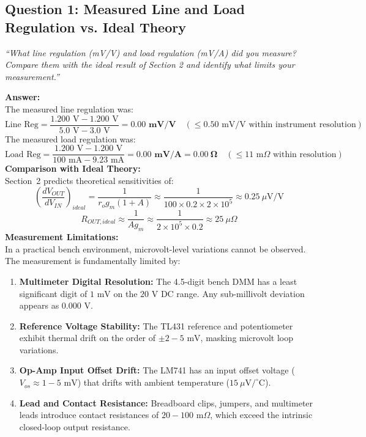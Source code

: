 \documentclass[11pt,a4paper]{article}
\begin{document}
\subsection{Question 1: Measured Line and Load Regulation vs. Ideal Theory}
\textit{``What line regulation (mV/V) and load regulation (mV/A) did you measure? Compare them with the ideal result of Section 2 and identify what limits your measurement.''}

\textbf{Answer:}\\
The measured line regulation was:
\begin{equation}
    \text{Line Reg} = \frac{1.200\text{ V} - 1.200\text{ V}}{5.0\text{ V} - 3.0\text{ V}} = \mathbf{0.00\text{ mV/V}} \quad (\le 0.50\text{ mV/V within instrument resolution})
\end{equation}
The measured load regulation was:
\begin{equation}
    \text{Load Reg} = \frac{1.200\text{ V} - 1.200\text{ V}}{100\text{ mA} - 9.23\text{ mA}} = \mathbf{0.00\text{ mV/A}} = \mathbf{0.00\ \Omega} \quad (\le 11\text{ m}\Omega \text{ within resolution})
\end{equation}
\textbf{Comparison with Ideal Theory:}\\
Section~2 predicts theoretical sensitivities of:
\begin{equation}
    \left(\frac{dV_{OUT}}{dV_{IN}}\right)_{ideal} = \frac{1}{r_o g_m (1 + A)} \approx \frac{1}{100 \times 0.2 \times 2 \times 10^5} \approx 0.25\ \mu\text{V/V}
\end{equation}
\begin{equation}
    R_{OUT,ideal} \approx \frac{1}{A g_m} \approx \frac{1}{2 \times 10^5 \times 0.2} \approx 25\ \mu\Omega
\end{equation}
\textbf{Measurement Limitations:}\\
In a practical bench environment, microvolt-level variations cannot be observed. The measurement is fundamentally limited by:
\begin{enumerate}
    \item \textbf{Multimeter Digital Resolution:} The 4.5-digit bench DMM has a least significant digit of $1\text{ mV}$ on the $20\text{ V}$ DC range. Any sub-millivolt deviation appears as $0.000\text{ V}$.
    \item \textbf{Reference Voltage Stability:} The TL431 reference and potentiometer exhibit thermal drift on the order of $\pm 2 - 5\text{ mV}$, masking microvolt loop variations.
    \item \textbf{Op-Amp Input Offset Drift:} The LM741 has an input offset voltage ($V_{os} \approx 1 - 5\text{ mV}$) that drifts with ambient temperature ($15\ \mu\text{V}/^\circ\text{C}$).
    \item \textbf{Lead and Contact Resistance:} Breadboard clips, jumpers, and multimeter leads introduce contact resistances of $20 - 100\text{ m}\Omega$, which exceed the intrinsic closed-loop output resistance.
\end{enumerate}
\end{document}
